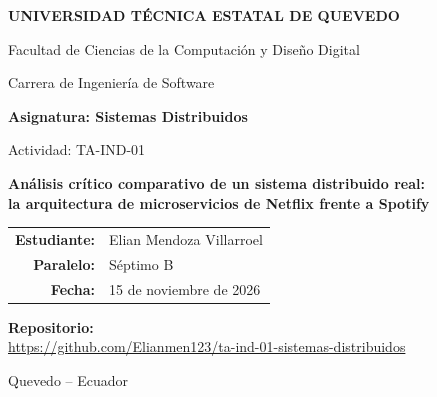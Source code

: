 \begin{titlepage}
  \centering

  {\Large\bfseries UNIVERSIDAD TÉCNICA ESTATAL DE QUEVEDO\par}
  \vspace{0.4cm}
  {\large Facultad de Ciencias de la Computación y Diseño Digital\par}
  \vspace{0.2cm}
  {\large Carrera de Ingeniería de Software\par}

  \vspace{2cm}

  {\large\bfseries Asignatura: Sistemas Distribuidos\par}
  \vspace{0.3cm}
  {\large Actividad: TA-IND-01\par}

  \vspace{2cm}

  {\Large\bfseries Análisis crítico comparativo de un sistema distribuido real:\\[0.2cm] la arquitectura de microservicios de Netflix frente a Spotify\par}

  \vspace{2.5cm}

  \begin{tabular}{rl}
    \textbf{Estudiante:} & Elian Mendoza Villarroel \\[0.2cm]
    \textbf{Paralelo:}   & Séptimo B \\[0.2cm]
    \textbf{Fecha:}      & 15 de noviembre de 2026 \\
  \end{tabular}

  \vfill

  \textbf{Repositorio:}\\[0.2cm]
  \url{https://github.com/Elianmen123/ta-ind-01-sistemas-distribuidos}

  \vspace{1cm}
  {\large Quevedo -- Ecuador\par}
\end{titlepage}
